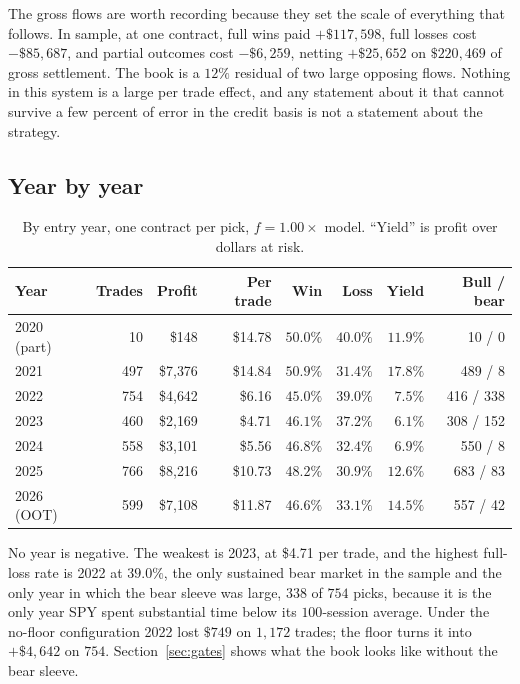 \documentclass[11pt]{article}
\begin{document}
The gross flows are worth recording because they set the scale of everything
that follows. In sample, at one contract, full wins paid $+\$117{,}598$, full
losses cost $-\$85{,}687$, and partial outcomes cost $-\$6{,}259$, netting
$+\$25{,}652$ on $\$220{,}469$ of gross settlement. The book is a $12\%$
residual of two large opposing flows. Nothing in this system is a large per
trade effect, and any statement about it that cannot survive a few percent of
error in the credit basis is not a statement about the strategy.

\subsection{Year by year}

\begin{table}[h]
\centering
\caption{By entry year, one contract per pick, $f = 1.00\times$ model.
``Yield'' is profit over dollars at risk.}
\label{tab:byyear}
\begin{tabular}{lrrrrrrr}
\toprule
Year & Trades & Profit & Per trade & Win & Loss & Yield & Bull / bear \\
\midrule
2020 (part) & 10  & \$148     & \$14.78 & $50.0\%$ & $40.0\%$ & $11.9\%$ & 10 / 0 \\
2021        & 497 & \$7{,}376 & \$14.84 & $50.9\%$ & $31.4\%$ & $17.8\%$ & 489 / 8 \\
2022        & 754 & \$4{,}642 & \$6.16  & $45.0\%$ & $39.0\%$ & $7.5\%$  & 416 / 338 \\
2023        & 460 & \$2{,}169 & \$4.71  & $46.1\%$ & $37.2\%$ & $6.1\%$  & 308 / 152 \\
2024        & 558 & \$3{,}101 & \$5.56  & $46.8\%$ & $32.4\%$ & $6.9\%$  & 550 / 8 \\
2025        & 766 & \$8{,}216 & \$10.73 & $48.2\%$ & $30.9\%$ & $12.6\%$ & 683 / 83 \\
2026 (OOT)  & 599 & \$7{,}108 & \$11.87 & $46.6\%$ & $33.1\%$ & $14.5\%$ & 557 / 42 \\
\bottomrule
\end{tabular}
\end{table}

No year is negative. The weakest is 2023, at \$4.71 per trade, and the highest
full-loss rate is 2022 at $39.0\%$, the only sustained bear market in the
sample and the only year in which the bear sleeve was large, $338$ of $754$
picks, because it is the only year SPY spent substantial time below its
$100$-session average. Under the no-floor configuration 2022 lost $\$749$ on
$1{,}172$ trades; the floor turns it into $+\$4{,}642$ on $754$.
Section~\ref{sec:gates} shows what the book looks like without the bear
sleeve.
\end{document}
